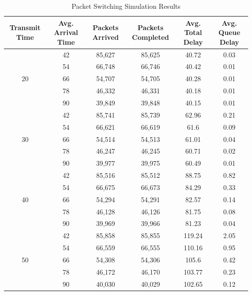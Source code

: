\documentclass{article}
\begin{document}
  \begin{table}[h!]
    \caption{Packet Switching Simulation Results}
    \centering
    {\footnotesize
      \begin{tabular}{|c|c|c|c|c|c|}
        \hline
        Transmit Time & Avg. Arrival Time & Packets Arrived & Packets Completed & Avg. Total Delay
        & Avg. Queue Delay\\
        \hline

        \multirow{5}{*}{20} & 42 & 85,627 & 85,625 & 40.72 & 0.03\\
        \cline{2-6}
        & 54 & 66,748 & 66,746 & 40.42 & 0.01\\
        \cline{2-6}
        & 66 & 54,707 & 54,705 & 40.28 & 0.01\\
        \cline{2-6}
        & 78 & 46,332 & 46,331 & 40.18 & 0.01\\
        \cline{2-6}
        & 90 & 39,849 & 39,848 & 40.15 & 0.01\\
        \hline

        \multirow{5}{*}{30} & 42 & 85,741 & 85,739 & 62.96 & 0.21\\
        \cline{2-6}
        & 54 & 66,621 & 66,619 & 61.6 & 0.09\\
        \cline{2-6}
        & 66 & 54,514 & 54,513 & 61.01 & 0.04\\
        \cline{2-6}
        & 78 & 46,247 & 46,245 & 60.71 & 0.02\\
        \cline{2-6}
        & 90 & 39,977 & 39,975 & 60.49 & 0.01\\
        \hline

        \multirow{5}{*}{40} & 42 & 85,516 & 85,512 & 88.75 & 0.82\\
        \cline{2-6}
        & 54 & 66,675 & 66,673 & 84.29 & 0.33\\
        \cline{2-6}
        & 66 & 54,294 & 54,291 & 82.57 & 0.14\\
        \cline{2-6}
        & 78 & 46,128 & 46,126 & 81.75 & 0.08\\
        \cline{2-6}
        & 90 & 39,969 & 39,966 & 81.23 & 0.04\\
        \hline

        \multirow{5}{*}{50} & 42 & 85,858 & 85,855 & 119.24 & 2.05\\
        \cline{2-6}
        & 54 & 66,559 & 66,555 & 110.16 & 0.95\\
        \cline{2-6}
        & 66 & 54,308 & 54,306 & 105.6 & 0.42\\
        \cline{2-6}
        & 78 & 46,172 & 46,170 & 103.77 & 0.23\\
        \cline{2-6}
        & 90 & 40,030 & 40,029 & 102.65 & 0.12\\
        \hline
      \end{tabular}
    }
  \end{table}
\end{document}
